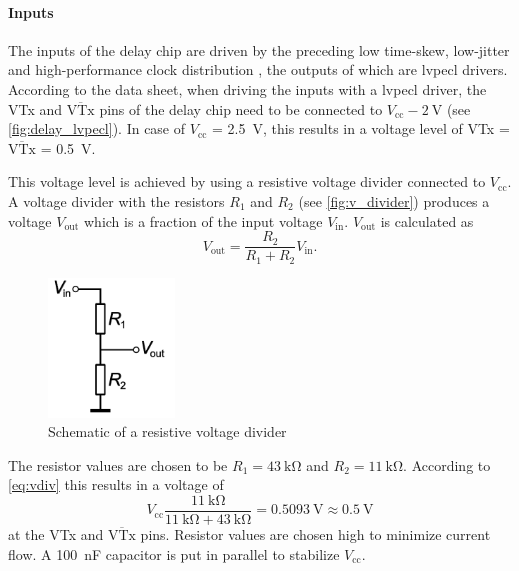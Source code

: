 \paragraph{Inputs}
The inputs of the delay chip are driven by the preceding low time-skew, low-jitter and high-performance clock distribution , the outputs of which are \gls{lvpecl} drivers.
According to the data sheet, when driving the inputs with a \gls{lvpecl} driver, the VTx and $\overline{\text{VTx}}$ pins of the delay chip need to be connected to $V_\text{cc} - \SI{2}{\volt}$ (see \autoref{fig:delay_lvpecl}).
In case of $V_\text{cc}$ = \SI{2.5}{\volt}, this results in a voltage level of VTx = $\overline{\text{VTx}}$ = \SI{0.5}{\volt}.

This voltage level is achieved by using a resistive voltage divider connected to $V_\text{cc}$. 
A voltage divider with the resistors $R_1$ and $R_2$ (see \autoref{fig:v_divider}) produces a voltage $V_\text{out}$ which is a fraction of the input voltage $V_\text{in}$.
$V_\text{out}$ is calculated as
\begin{equation}\label{eq:vdiv}
	V_\text{out} = \frac{R_2}{R_1 + R_2} V_\text{in}.
\end{equation}
\begin{figure}[H]
	\centering
	\includegraphics[width = 0.3\textwidth]{chap/04-theresa/img/voltage_divider.pdf}
	\caption{Schematic of a resistive voltage divider}
	\label{fig:v_divider}
\end{figure}
The resistor values are chosen to be $R_1 = \SI{43}{\kilo\ohm}$ and $R_2 = \SI{11}{\kilo\ohm}$.
According to \autoref{eq:vdiv} this results in a voltage of
\begin{equation}
	V_\text{cc} \frac{\SI{11}{\kilo\ohm}}{\SI{11}{\kilo\ohm} + \SI{43}{\kilo\ohm}} = \SI{0.5093}{\volt} \approx \SI{0.5}{\volt}
\end{equation}
at the VTx and $\overline{\text{VTx}}$ pins.
Resistor values are chosen high to minimize current flow.
A \SI{100}{\nano\farad} capacitor is put in parallel to stabilize $V_\text{cc}$.

